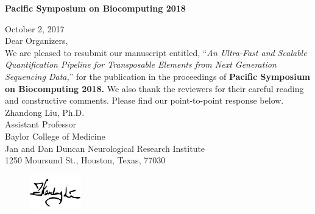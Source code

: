 \documentclass[10pt]{article}
\newcommand\PaperTitle[1]{``\textit{#1}''}
\begin{document}
\noindent \textbf{Pacific Symposium on Biocomputing 2018}

\noindent October 2, 2017 \\

\noindent Dear Organizers,\\

We are pleased to resubmit our manuscript entitled, \PaperTitle{An Ultra-Fast and Scalable Quantification Pipeline for Transposable Elements from Next Generation Sequencing Data,} for the publication in the proceedings of \textbf{Pacific Symposium on Biocomputing 2018.}
We also thank the reviewers for their careful reading and constructive comments.  Please find our point-to-point response below.  \\

\noindent Zhandong Liu, Ph.D. \\
Assistant Professor\\
Baylor College of Medicine \\
Jan and Dan Duncan Neurological Research Institute \\
1250 Moursund St., Houston, Texas, 77030 

\begin{figure}[h]
    \includegraphics[width=0.2\textwidth]{zdsig.png}
\end{figure}
\end{document}
